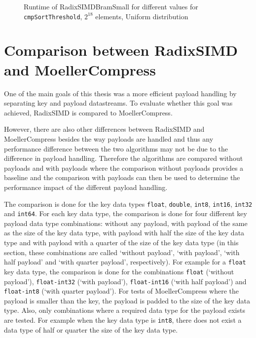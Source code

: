 \documentclass[12pt, a4paper, openright, twoside]{tiarbeit}
\begin{document}
\begin{figure}[H]
\begin{minipage}{0.49\textwidth}
    \caption{Runtime of RadixSIMDBramSmall for different values for \texttt{cmpSortThreshold}, $2^{18}$ elements, Uniform distribution}
    \label{fig:cmpThresh-RadixSIMDBramSmall}
  \end{minipage}
\end{figure}

\section{Comparison between RadixSIMD and MoellerCompress}
\label{sec:cmpRadixSIMD-MoellerCompress}

One of the main goals of this thesis was a more efficient payload handling by
separating key and payload datastreams. To evaluate whether this goal was
achieved, RadixSIMD is compared to MoellerCompress.

However, there are also other differences between RadixSIMD and MoellerCompress
besides the way
payloads are handled and thus any performance difference between the two algorithms
may not be due to the difference in payload handling.
Therefore the algorithms are compared without payloads and with
payloads where the comparison without payloads provides a baseline and the comparison
with payloads can then be used to determine the performance impact of the
different payload handling.

The comparison is done for the key data types \texttt{float}, \texttt{double},
\texttt{int8}, \texttt{int16}, \texttt{int32} and \texttt{int64}. For each
key data type, the comparison is done for four different key payload
data type combinations: without any payload, with payload of the same as the
size of the key data type, with payload with half the size of the key data type
and
with payload with a quarter of the size of the key data type
(in this section, these combinations are called `without payload',
`with payload', `with half payload' and `with quarter payload', respectively).
For example for a \texttt{float} key data type, the comparison is done
for the combinations \texttt{float} (`without payload'), \texttt{float-int32}
(`with payload'), \texttt{float-int16} (`with half payload') and
\texttt{float-int8} (`with quarter payload').
For tests of MoellerCompress where the payload is
smaller than the key, the payload is padded to the size of the key data type.
Also, only combinations where a required data type for the payload exists
are tested. For example when the key data type is \texttt{int8}, there
does not exist a data type of half or quarter the size of the key data type.
\end{document}
